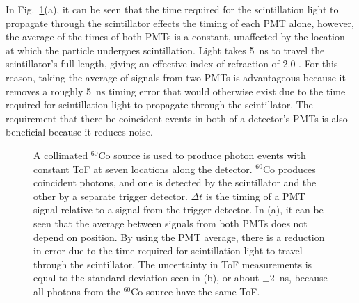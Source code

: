 In Fig.~\ref{fig:ConstPMTAvg}(a), it can be seen that the time required for the scintillation light to propagate through the scintillator effects the timing of each PMT alone, however, the average of the times of both PMTs is a constant, unaffected by the location at which the particle undergoes scintillation.
Light takes 5~ns to travel the scintillator's full length, giving an effective index of refraction of 2.0 .
For this reason, taking the average of signals from two PMTs is advantageous because it removes a roughly 5~ns timing error that would otherwise exist due to the time required for scintillation light to propagate through the scintillator.
The requirement that there be coincident events in both of a detector's PMTs is also beneficial because it reduces noise.
\begin{figure}[h]
\centering
{}

\caption{A collimated $^{60}$Co source is used to produce photon events with constant ToF at seven locations along the detector.
$^{60}$Co produces coincident photons, and one is detected by the scintillator and the other by a separate trigger detector.
 $\Delta t$ is the timing of a PMT signal relative to a signal from the trigger detector. 
 In (a), it can be seen that the average between signals from both PMTs does not depend on position.
By using the PMT average, there is a reduction in error due to the time required for scintillation light to travel through the scintillator.
The uncertainty in ToF measurements is equal to the standard deviation seen in (b), or about $\pm$2~ns, because all photons from the $^{60}$Co source have the same ToF.}
\label{fig:ConstPMTAvg}
\end{figure}

